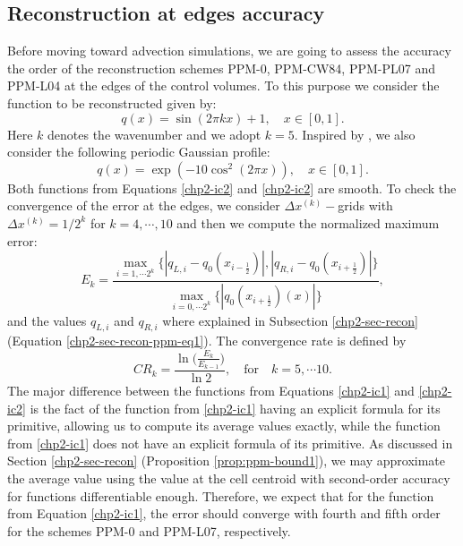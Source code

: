 \subsection{Reconstruction at edges accuracy}
\label{chp2-num-exp-recon}
Before moving toward advection simulations, we are going to assess the accuracy the 
order of the reconstruction schemes PPM-0, PPM-CW84, PPM-PL07 and PPM-L04 at the
edges of the control volumes.
To this purpose we consider the function to be reconstructed given by:
\begin{equation}
	\label{chp2-ic1}
	q(x) = \sin (2\pi k x) + 1, \quad x \in [0,1].
\end{equation}
Here $k$ denotes the wavenumber and we adopt $k=5$.
Inspired by \citet{trefethen:2000}, we also consider the following periodic Gaussian profile:
\begin{equation}
	\label{chp2-ic2}
	q(x) = \exp(-10\cos^2 (2\pi x)),\quad x \in [0,1].
\end{equation}
Both functions from Equations \eqref{chp2-ic2} and \eqref{chp2-ic2} are smooth.
To check the convergence of the error at the edges, we consider $\Delta x^{(k)}-$grids with $\Delta x^{(k)} = 1/2^k$ for $k=4, \cdots, 10$ and then we compute the normalized maximum error:
\begin{equation*}
	E_k =\frac{\max_{i=1, \cdots 2^k}\{|q_{L,i}-q_0(x_{i-\frac{1}{2}})|,|q_{R,i}-q_0(x_{i+\frac{1}{2}})|\}}
	{\max_{i=0, \cdots 2^k}\{|q_0(x_{i+\frac{1}{2}})(x)|\}},
\end{equation*}
and the values $q_{L,i}$ and $q_{R,i}$ where explained in Subsection \ref{chp2-sec-recon} (Equation \eqref{chp2-sec-recon-ppm-eq1}). The convergence rate is defined by
\begin{equation*}
	 CR_k = \frac{\ln{\bigg(\frac{E_{k}}{E_{k-1}}}\bigg)}{\ln 2}, \quad \text{for} \quad k = 5, \cdots 10.
\end{equation*}
The major difference between the functions from Equations \eqref{chp2-ic1} and
\eqref{chp2-ic2} is the fact of the function from \eqref{chp2-ic1} having an explicit formula for its primitive, allowing us to compute its average values exactly, while
the function from \eqref{chp2-ic1} does not have an explicit formula of its primitive.
As discussed in Section \ref{chp2-sec-recon} (Proposition \ref{prop:ppm-bound1}), we may approximate the average value using the value at
the cell centroid with second-order accuracy for functions differentiable enough.
Therefore, we expect that for the function from Equation \eqref{chp2-ic1}, the error
should converge with fourth and fifth order for the schemes PPM-0 and PPM-L07, respectively.
